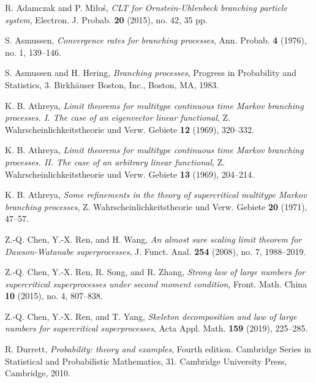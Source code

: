 \documentclass[12pt,a4paper]{amsart}
\theoremstyle{plain}
\theoremstyle{definition}
\numberwithin{equation}{section}
\begin{document}
\begin{thebibliography}{10}

  R. Adamczak and P. Mi{\l}o\'{s}, \emph{C{LT} for {O}rnstein-{U}hlenbeck branching particle system},
  Electron. J. Probab. \textbf{20} (2015), no. 42, 35 pp.

  S. Asmussen, \emph{Convergence rates for branching processes},
  Ann. Probab.  \textbf{4} (1976), no. 1, 139--146.

  S. Asmussen and H. Hering, \emph{Branching processes},
  Progress in Probability and Statistics, 3. Birkh\"{a}user Boston, Inc., Boston, MA, 1983.

  K. B. Athreya,
  \emph{Limit theorems for multitype continuous time {M}arkov branching processes. {I}. {T}he case of an eigenvector linear functional},
  Z. Wahrscheinlichkeitstheorie und Verw. Gebiete \textbf{12} (1969), 320--332.

  K. B. Athreya,
  \emph{Limit theorems for multitype continuous time {M}arkov branching processes. {II}. {T}he case of an arbitrary linear functional},
  Z. Wahrscheinlichkeitstheorie und Verw. Gebiete \textbf{13} (1969), 204--214.

  K. B. Athreya,
  \emph{Some refinements in the theory of supercritical multitype {M}arkov branching processes},
  Z. Wahrscheinlichkeitstheorie und Verw. Gebiete \textbf{20} (1971), 47--57.

  Z.-Q. Chen, Y.-X. Ren, and H. Wang,
  \emph{An almost sure scaling limit theorem for {D}awson-{W}atanabe superprocesses},
  J. Funct. Anal. \textbf{254} (2008), no. 7, 1988--2019.

   Z.-Q. Chen, Y.-X. Ren, R. Song, and R. Zhang,
   \emph{Strong law of large numbers for supercritical superprocesses under second moment condition},
   Front. Math. China \textbf{10} (2015), no. 4, 807--838.

   Z.-Q. Chen, Y.-X. Ren, and T. Yang,
   \emph{Skeleton decomposition and law of large numbers for supercritical superprocesses},
   Acta Appl. Math. \textbf{159} (2019), 225--285.

   R. Durrett,
   \emph{Probability: theory and examples},
   Fourth edition. Cambridge Series in Statistical and Probabilistic Mathematics, 31. Cambridge University Press, Cambridge, 2010.


\end{thebibliography}
\end{document}
